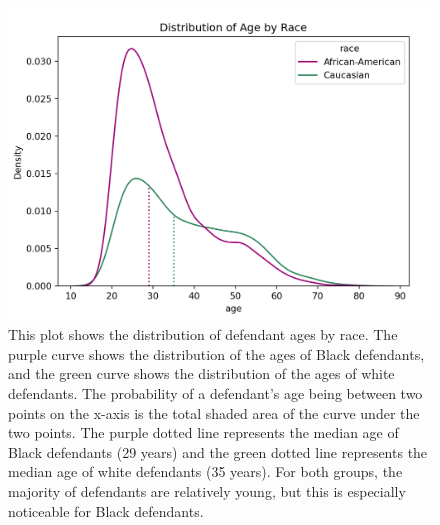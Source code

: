 \documentclass[water,article,submit,moreauthors,pdftex]{mdpi}
\begin{document}
\begin{figure}

{\centering \includegraphics[width=1\linewidth]{../images/age_race_plot_new}

}

\caption{This plot shows the distribution of defendant ages by race. The purple curve shows the distribution of the ages of Black defendants, and the green curve shows the distribution of the ages of white defendants. The probability of a defendant's age being between two points on the x-axis is the total shaded area of the curve under the two points. The purple dotted line represents the median age of Black defendants (29 years) and the green dotted line represents the median age of white defendants (35 years). For both groups, the majority of defendants are relatively young, but this is especially noticeable for Black defendants.}\label{fig:age plot}
\end{figure}
\end{document}
